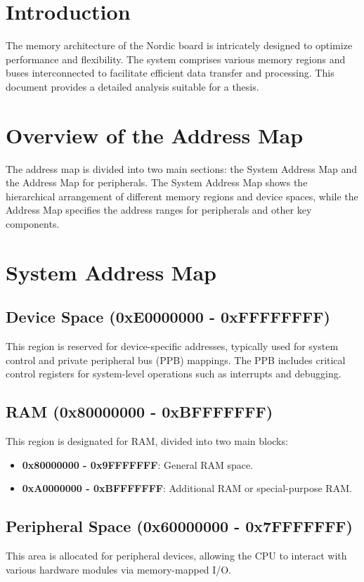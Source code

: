 \documentclass{Configuration_Files/PoliMi3i_thesis}
\begin{document}
\section{Introduction}
The memory architecture of the Nordic board is intricately designed to optimize performance and flexibility. The system comprises various memory regions and buses interconnected to facilitate efficient data transfer and processing. This document provides a detailed analysis suitable for a thesis.

\section{Overview of the Address Map}
The address map is divided into two main sections: the System Address Map and the Address Map for peripherals. The System Address Map shows the hierarchical arrangement of different memory regions and device spaces, while the Address Map specifies the address ranges for peripherals and other key components.

\section{System Address Map}

\subsection{Device Space (0xE0000000 - 0xFFFFFFFF)}
This region is reserved for device-specific addresses, typically used for system control and private peripheral bus (PPB) mappings. The PPB includes critical control registers for system-level operations such as interrupts and debugging.

\subsection{RAM (0x80000000 - 0xBFFFFFFF)}
This region is designated for RAM, divided into two main blocks:
\begin{itemize}
    \item \textbf{0x80000000 - 0x9FFFFFFF}: General RAM space.
    \item \textbf{0xA0000000 - 0xBFFFFFFF}: Additional RAM or special-purpose RAM.
\end{itemize}

\subsection{Peripheral Space (0x60000000 - 0x7FFFFFFF)}
This area is allocated for peripheral devices, allowing the CPU to interact with various hardware modules via memory-mapped I/O.
\end{document}
